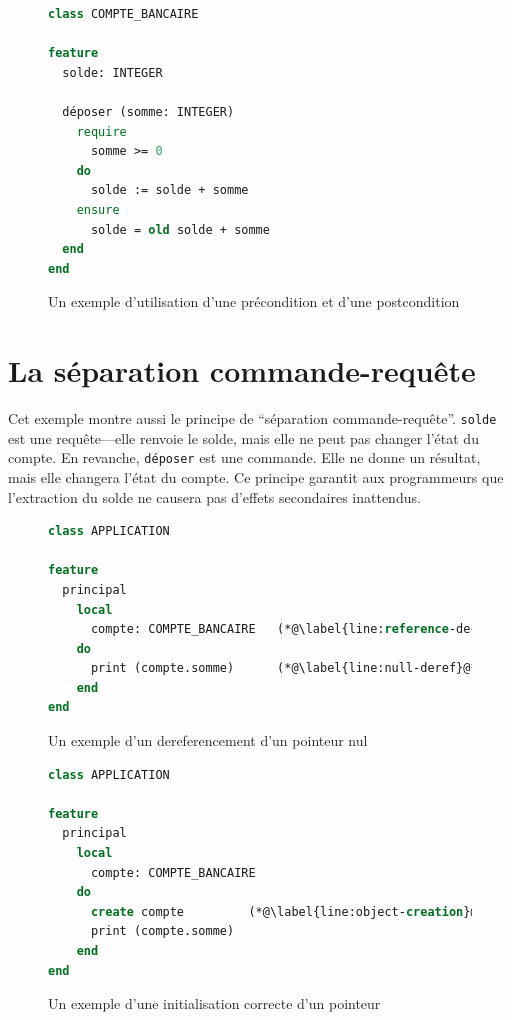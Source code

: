 \documentclass[french]{report}
\begin{document}
\begin{figure}[h]
	\begin{lstlisting}[language=Eiffel]
class COMPTE_BANCAIRE

feature
  solde: INTEGER

  déposer (somme: INTEGER)
    require
      somme >= 0
    do
      solde := solde + somme
    ensure
      solde = old solde + somme
  end
end
	\end{lstlisting}
	
	\caption{Un exemple d'utilisation d'une précondition et d'une postcondition\protect\footnotemark}
	\label{fig:pre-post-condition}
\end{figure}


\section{La séparation commande-requête}

Cet exemple montre aussi le principe de \enquote{séparation commande-requête}. \texttt{solde} est une requête---elle renvoie le solde, mais elle ne peut pas changer l'état du compte. En revanche, \texttt{déposer} est une commande. Elle ne donne un résultat, mais elle changera l'état du compte. Ce principe garantit aux programmeurs que l'extraction du solde ne causera pas d'effets secondaires inattendus.

\begin{figure}[h]
	\begin{lstlisting}[language=Eiffel]
class APPLICATION

feature
  principal
    local
      compte: COMPTE_BANCAIRE 	(*@\label{line:reference-declaration}@*)
    do
      print (compte.somme)		(*@\label{line:null-deref}@*)
    end
end
	\end{lstlisting}
	
	\caption{Un exemple d'un \gls{dereferencement} d'un pointeur nul}
	\label{fig:null-deref-condition}
\end{figure}

\begin{figure}[h]
	\begin{lstlisting}[language=Eiffel]
class APPLICATION
	
feature
  principal
    local
      compte: COMPTE_BANCAIRE
    do
      create compte 		(*@\label{line:object-creation}@*)
      print (compte.somme) 	
    end
end
	\end{lstlisting}
	
	\caption{Un exemple d'une initialisation correcte d'un pointeur}
	\label{fig:nonnull-deref-condition}
\end{figure}
\end{document}

